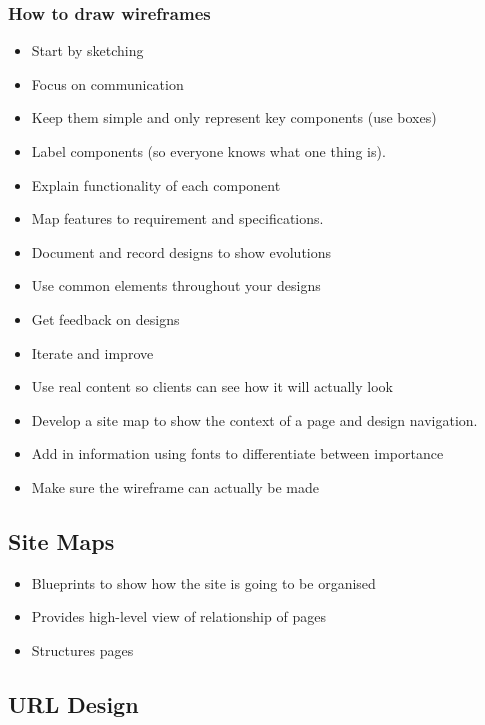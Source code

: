\subsubsection{How to draw wireframes}\label{ssub:how_to_draw_wireframes}

\begin{itemize}
	\item Start by sketching
	\item Focus on communication
	\item Keep them simple and only represent key components (use boxes)
	\item Label components (so everyone knows what one thing is).
	\item Explain functionality of each component
	\item Map features to requirement and specifications.
	\item Document and record designs to show evolutions
	\item Use common elements throughout your designs
	\item Get feedback on designs
	\item Iterate and improve
	\item Use real content so clients can see how it will actually look
	\item Develop a site map to show the context of a page and design navigation.
	\item Add in information using fonts to differentiate between importance
	\item Make sure the wireframe can actually be made
\end{itemize}

\subsection{Site Maps}\label{sub:site_maps_was}

\begin{itemize}
	\item Blueprints to show how the site is going to be organised
	\item Provides high-level view of relationship of pages
	\item Structures pages
\end{itemize}

\subsection{URL Design}\label{sub:url_design_was}

